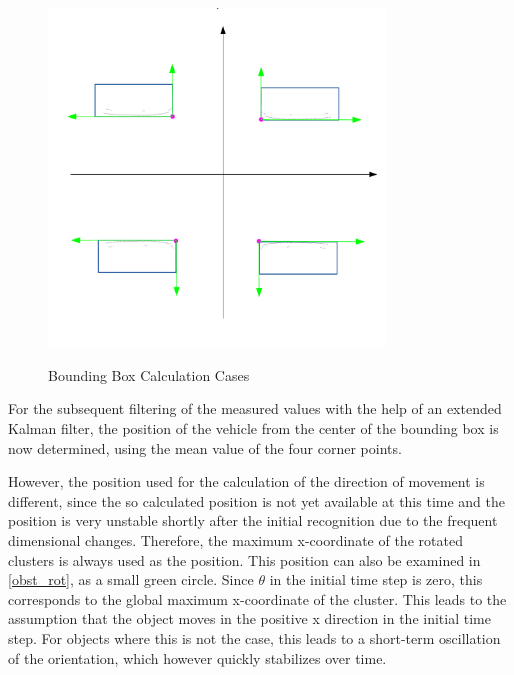 \documentclass[11pt,oneside,openright]{mpreport}
\begin{document}
\begin{figure}[!ht]
\begin{center}
\caption{Bounding Box Calculation Cases}
\includegraphics[width=0.8\textwidth]{bilder/cases.pdf}
\label{obst_cases}
\end{center}
\end{figure}


For the subsequent filtering of the measured values with the help of an extended Kalman filter, the position of the vehicle from the center of the bounding box is now
determined, using the mean value of the four corner points.


However, the position used for the calculation of the direction of movement is different, since the so calculated position is not yet available at this time 
and the position is very unstable shortly after the initial recognition due to the frequent dimensional changes. Therefore, the maximum x-coordinate
of the rotated clusters is always used as the position. This position can also be examined in \cref{obst_rot}, as a small green circle. Since $\theta$ in the initial time step is zero, 
this corresponds to the global maximum x-coordinate of the cluster. This leads to the assumption that the object moves in the positive x direction in the initial time step. 
For objects where this is not the case, this leads to a short-term oscillation of the orientation, which however quickly stabilizes over time.
\end{document}
